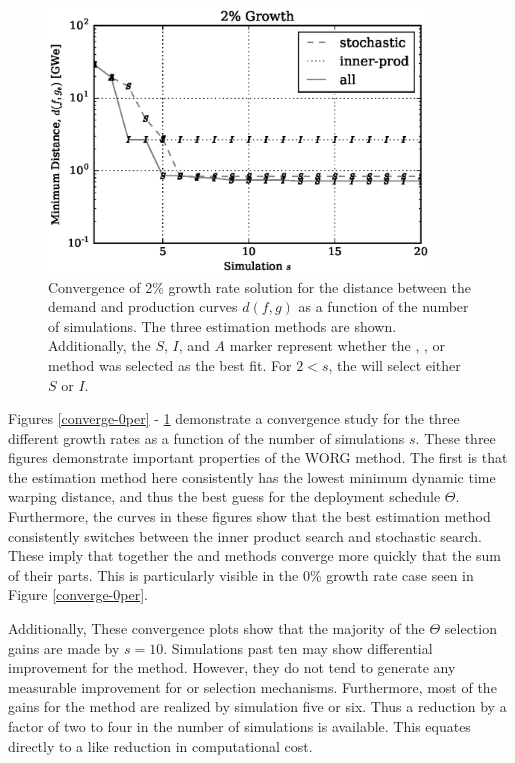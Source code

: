 \begin{figure}[htb]
\centering
\includegraphics[width=0.9\textwidth]{converge-2per.eps}
\caption{Convergence of 2\% growth rate solution for the distance between
the demand and production curves $d(f, g)$ as a function of the number of 
simulations. The three estimation methods are shown. Additionally, the
$S$, $I$, and $A$ marker represent whether the \stochastic, \innerprod, 
or \allflag method was selected as the best fit. For $2 < s$, the \allflag
will select either $S$ or $I$.
}
\label{converge-2per}
\end{figure}

Figures \ref{converge-0per} - \ref{converge-2per} demonstrate a convergence 
study for the three 
different growth rates as a function of the number of simulations $s$.
These three figures demonstrate important properties of the WORG method.
The first is that the \allflag estimation method here consistently has
the lowest minimum dynamic time warping distance, and thus the best guess 
for the deployment schedule $\Theta$.  Furthermore, the \allflag curves
in these figures show that the best estimation method consistently switches
between the inner product search and stochastic search. These imply 
that together the \stochastic and \innerprod methods converge more quickly 
that the sum of their parts.  This is particularly visible in the 0\% growth
rate case seen in Figure \ref{converge-0per}.

Additionally, These convergence plots show that the majority of the 
$\Theta$ selection gains are made by $s=10$.  Simulations past ten may 
show differential improvement for the \allflag method.  However, they 
do not tend to generate any measurable improvement for \stochastic or
\innerprod selection mechanisms. Furthermore, most of the gains for the 
\allflag method are realized by simulation five or six. Thus a reduction
by a factor of two to four in the number of simulations is available.
This equates directly to a like reduction in computational cost.

